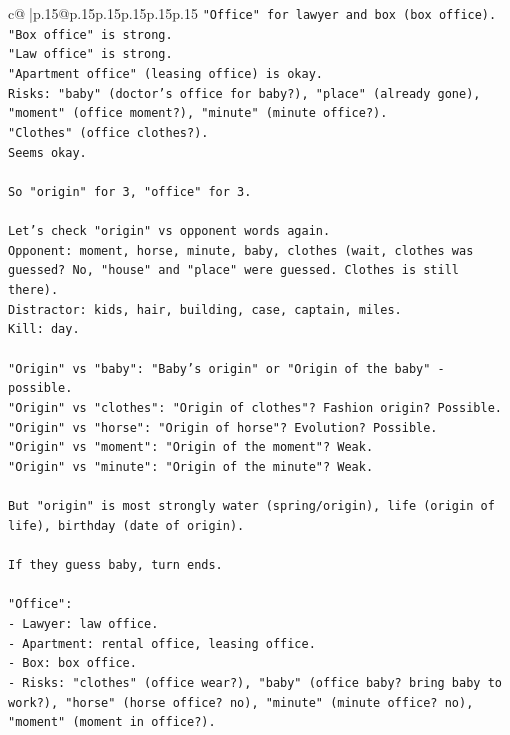 \documentclass{article}
\begin{document}
{\begin{supertabular}{c@{$\;$}|p{.15\linewidth}@{}p{.15\linewidth}p{.15\linewidth}p{.15\linewidth}p{.15\linewidth}p{.15\linewidth}}
{{{\texttt{"Office" for lawyer and box (box office).} \\
\texttt{"Box office" is strong.} \\
\texttt{"Law office" is strong.} \\
\texttt{"Apartment office" (leasing office) is okay.} \\
\texttt{Risks: "baby" (doctor's office for baby?), "place" (already gone), "moment" (office moment?), "minute" (minute office?).} \\
\texttt{"Clothes" (office clothes?).} \\
\texttt{Seems okay.} \\
\\ 
\texttt{So "origin" for 3, "office" for 3.} \\
\\ 
\texttt{Let's check "origin" vs opponent words again.} \\
\texttt{Opponent: moment, horse, minute, baby, clothes (wait, clothes was guessed? No, "house" and "place" were guessed. Clothes is still there).} \\
\texttt{Distractor: kids, hair, building, case, captain, miles.} \\
\texttt{Kill: day.} \\
\\ 
\texttt{"Origin" vs "baby": "Baby's origin" or "Origin of the baby" {-} possible.} \\
\texttt{"Origin" vs "clothes": "Origin of clothes"? Fashion origin? Possible.} \\
\texttt{"Origin" vs "horse": "Origin of horse"? Evolution? Possible.} \\
\texttt{"Origin" vs "moment": "Origin of the moment"? Weak.} \\
\texttt{"Origin" vs "minute": "Origin of the minute"? Weak.} \\
\\ 
\texttt{But "origin" is most strongly water (spring/origin), life (origin of life), birthday (date of origin).} \\
\\ 
\texttt{If they guess baby, turn ends.} \\
\\ 
\texttt{"Office":} \\
\texttt{{-} Lawyer: law office.} \\
\texttt{{-} Apartment: rental office, leasing office.} \\
\texttt{{-} Box: box office.} \\
\texttt{{-} Risks: "clothes" (office wear?), "baby" (office baby? bring baby to work?), "horse" (horse office? no), "minute" (minute office? no), "moment" (moment in office?).} \\
}}}
\end{supertabular}}
\end{document}
